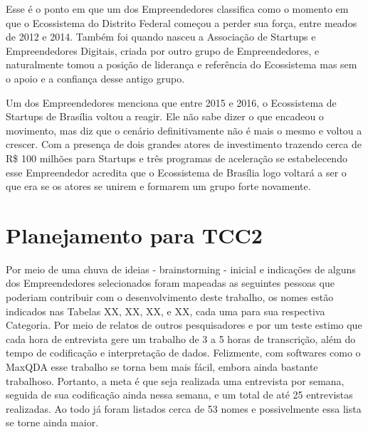 Esse é o ponto em que um dos Empreendedores classifica como o momento em que o Ecossistema do Distrito Federal começou a perder sua força, entre meados de 2012 e 2014. Também foi quando nasceu a Associação de Startups e Empreendedores Digitais, criada por outro grupo de Empreendedores, e naturalmente tomou a posição de liderança e referência do Ecossistema mas sem o apoio e a confiança desse antigo grupo.

Um dos Empreendedores menciona que entre 2015 e 2016, o Ecossistema de Startups de Brasília voltou a reagir. Ele não sabe dizer o que encadeou o movimento, mas diz que o cenário definitivamente não é mais o mesmo e voltou a crescer. Com a presença de dois grandes atores de investimento trazendo cerca de R\$ 100 milhões para Startups e três programas de aceleração se estabelecendo esse Empreendedor acredita que o Ecossistema de Brasília logo voltará a ser o que era se os atores se unirem e formarem um grupo forte novamente.

\section{Planejamento para TCC2}
\label{section:cronograma_tcc2}

Por meio de uma chuva de ideias - brainstorming - inicial e indicações de alguns dos Empreendedores selecionados foram mapeadas as seguintes pessoas que poderiam contribuir com o desenvolvimento deste trabalho, os nomes estão indicados nas Tabelas XX, XX, XX, e XX, cada uma para sua respectiva Categoria. Por meio de relatos de outros pesquisadores e por um teste estimo que cada hora de entrevista gere um trabalho de 3 a 5 horas de transcrição, além do tempo de codificação e interpretação de dados. Felizmente, com softwares como o MaxQDA esse trabalho se torna bem mais fácil, embora ainda bastante trabalhoso. Portanto, a meta é que seja realizada uma entrevista por semana, seguida de sua codificação ainda nessa semana, e um total de até 25 entrevistas realizadas. Ao todo já foram listados cerca de 53 nomes e possivelmente essa lista se torne ainda maior.

